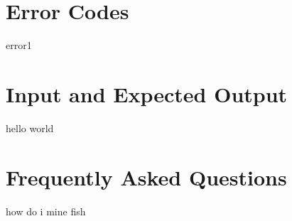 \section{Error Codes}
error1
\section{Input and Expected Output}
hello world
\section{Frequently Asked Questions}
how do i mine fish